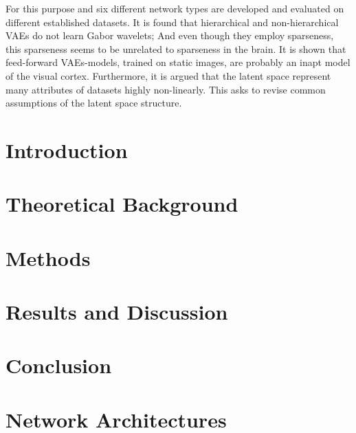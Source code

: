 \documentclass[11pt,a4paper]{article}
\let\oldsection\section
\renewcommand\section{\clearpage\oldsection}
\newcounter{savepage}
\begin{document}
For this purpose and six different network types are developed and evaluated on different established datasets.
It is found that hierarchical and non-hierarchical \acp{VAE} do not learn Gabor wavelets;
And even though they employ sparseness, this sparseness seems to be unrelated to sparseness in the brain.
It is shown that feed-forward \acp{VAE}-models, trained on static images, are probably an inapt model of the visual cortex.
Furthermore, it is argued that the latent space represent many attributes of datasets highly non-linearly.
This asks to revise common assumptions of the latent space structure.
\restoregeometry
\clearpage

\tableofcontents
\newpage
\listoffigures
\newpage
\listoftables
\newpage
{}


\acresetall
\section{Introduction}\label{sec:introduction}


\acresetall
\section{Theoretical Background}\label{sec:theoretical-background}


\acresetall
\section{Methods}\label{sec:methods}


\acresetall
\section{Results and Discussion}\label{sec:results}


\acresetall
\section{Conclusion}\label{sec:conclusion}




\newpage
\printbibliography

\newpage
{}
\setcounter{page}{\thesavepage}

\appendix


\section{Network Architectures}\label{sec:appendix_network_architectures}

\end{document}
